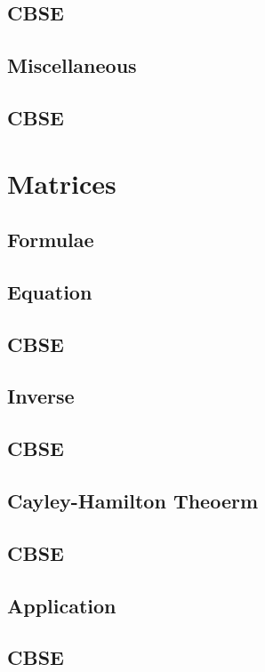 \documentclass[journal]{IEEEtran}
\begin{document}
\subsection{CBSE}

\subsection{Miscellaneous }

\subsection{CBSE}

\newpage
\section{Matrices}
\subsection{Formulae}

\subsection{Equation}

\subsection{CBSE}

\subsection{Inverse}

\subsection{CBSE}

\subsection{Cayley-Hamilton Theoerm}

\subsection{CBSE}

\subsection{Application}

\subsection{CBSE}

\end{document}
